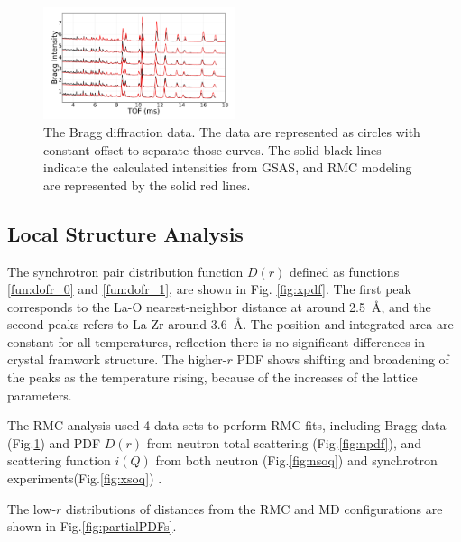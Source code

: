 \documentclass[twoside,twocolumn,9pt]{article}
\begin{document}
\begin{figure}[t]
\centering
\includegraphics[width=0.5\textwidth]{Pics/bragg.pdf}
\caption{The Bragg diffraction data. The data are represented as circles with constant offset to separate those curves.
The solid black lines indicate the  calculated intensities from GSAS, and RMC modeling are represented by the solid red lines. }
\label{fig:Rietveld_refinement}
\end{figure}

\subsection{Local Structure Analysis}
The synchrotron pair distribution function $D(r)$ defined as functions \ref{fun:dofr_0} and \ref{fun:dofr_1}, are shown in Fig. \ref{fig:xpdf}.
The first peak corresponds to the La-O nearest-neighbor distance at around 2.5~\AA, and the second peaks refers to La-Zr around 3.6~\AA.
The position and integrated area are constant for all temperatures,
reflection there is no significant differences in crystal framwork structure. The higher-$r$ PDF shows shifting and broadening of the peaks as the temperature rising,
because of the increases of the lattice parameters.

 The RMC analysis used 4 data sets to perform RMC fits, including Bragg data (Fig.\ref{fig:Rietveld_refinement}) and PDF $D(r)$ from neutron total scattering (Fig.\ref{fig:npdf}),
 and scattering function $i(Q)$ from both neutron (Fig.\ref{fig:nsoq})  and synchrotron experiments(Fig.\ref{fig:xsoq}) .


The low-$r$  distributions of distances from the RMC and MD configurations are shown in  Fig.\ref{fig:partialPDFs}. 
\end{document}
